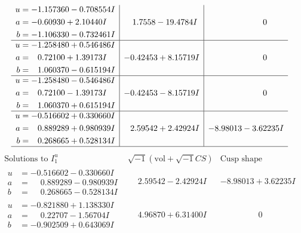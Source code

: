 \documentclass[1p]{elsarticle_modified}
\theoremstyle{definition}
\newcommand{\I}{\sqrt{-1}}
\begin{document}
$$\begin{array}{c|c|c}
\begin{aligned}
u &= -1.157360 - 0.708554 I \\
a &= -0.60930 + 2.10440 I \\
b &= -1.106330 - 0.732461 I\end{aligned}
 & \phantom{-}1.7558 - 19.4784 I & \phantom{-0.000000 } 0 \\ \hline\begin{aligned}
u &= -1.258480 + 0.546486 I \\
a &= \phantom{-}0.72100 + 1.39173 I \\
b &= \phantom{-}1.060370 - 0.615194 I\end{aligned}
 & -0.42453 + 8.15719 I & \phantom{-0.000000 } 0 \\ \hline\begin{aligned}
u &= -1.258480 - 0.546486 I \\
a &= \phantom{-}0.72100 - 1.39173 I \\
b &= \phantom{-}1.060370 + 0.615194 I\end{aligned}
 & -0.42453 - 8.15719 I & \phantom{-0.000000 } 0 \\ \hline\begin{aligned}
u &= -0.516602 + 0.330660 I \\
a &= \phantom{-}0.889289 + 0.980939 I \\
b &= \phantom{-}0.268665 + 0.528134 I\end{aligned}
 & \phantom{-}2.59542 + 2.42924 I & -8.98013 - 3.62235 I\\
 \hline 
 \end{array}$$\newpage$$\begin{array}{c|c|c}  
\text{Solutions to }I^u_{1}& \I (\text{vol} + \sqrt{-1}CS) & \text{Cusp shape}\\
 \hline 
\begin{aligned}
u &= -0.516602 - 0.330660 I \\
a &= \phantom{-}0.889289 - 0.980939 I \\
b &= \phantom{-}0.268665 - 0.528134 I\end{aligned}
 & \phantom{-}2.59542 - 2.42924 I & -8.98013 + 3.62235 I \\ \hline\begin{aligned}
u &= -0.821880 + 1.138330 I \\
a &= \phantom{-}0.22707 - 1.56704 I \\
b &= -0.902509 + 0.643069 I\end{aligned}
 & \phantom{-}4.96870 + 6.31400 I & \phantom{-0.000000 } 0 \\ \hline\begin{aligned}

\end{aligned}
\end{array}$$
\end{document}
